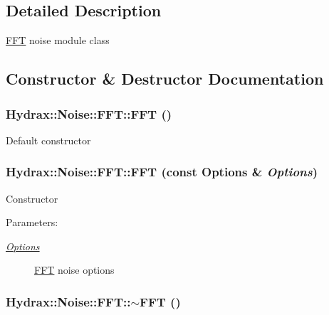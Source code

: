 \subsection{Detailed Description}
\hyperlink{class_hydrax_1_1_noise_1_1_f_f_t}{FFT} noise module class 

\subsection{Constructor \& Destructor Documentation}
\hypertarget{class_hydrax_1_1_noise_1_1_f_f_t_5e4f2e1075138aa5255e0f2c90f0e004}{
\subsubsection[{FFT}]{\setlength{\rightskip}{0pt plus 5cm}Hydrax::Noise::FFT::FFT ()}}
\label{class_hydrax_1_1_noise_1_1_f_f_t_5e4f2e1075138aa5255e0f2c90f0e004}


Default constructor \hypertarget{class_hydrax_1_1_noise_1_1_f_f_t_39e0f2bd11f4fcd7afab5a0977446c3e}{
\subsubsection[{FFT}]{\setlength{\rightskip}{0pt plus 5cm}Hydrax::Noise::FFT::FFT (const {\bf Options} \& {\em Options})}}
\label{class_hydrax_1_1_noise_1_1_f_f_t_39e0f2bd11f4fcd7afab5a0977446c3e}


Constructor \begin{Desc}
\item[Parameters:]
\begin{description}
\item[{\em \hyperlink{struct_hydrax_1_1_noise_1_1_f_f_t_1_1_options}{Options}}]\hyperlink{class_hydrax_1_1_noise_1_1_f_f_t}{FFT} noise options \end{description}
\end{Desc}
\hypertarget{class_hydrax_1_1_noise_1_1_f_f_t_fd96b8a520f12c10d7cffe16a776034e}{
\subsubsection[{$\sim$FFT}]{\setlength{\rightskip}{0pt plus 5cm}Hydrax::Noise::FFT::$\sim$FFT ()}}
\label{class_hydrax_1_1_noise_1_1_f_f_t_fd96b8a520f12c10d7cffe16a776034e}


